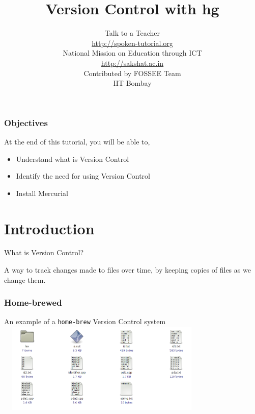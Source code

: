 \documentclass[17pt,compress]{beamer}
\author[FOSSEE]{}
\institute[IIT Bombay]{}
\date[]{}
\newcommand{\typ}[1]{\lstinline{#1}}
\begin{document}
\sffamily \bfseries
\title
[Version Control with hg]
{Version Control with hg}
\author
[FOSSEE]
{\small Talk to a Teacher\\{\color{blue}\url{http://spoken-tutorial.org}}\\\vspace{0.25cm}National Mission on Education
 through ICT\\{\color{blue}\url{ http://sakshat.ac.in}} \\ [1.65cm]
   Contributed by FOSSEE Team \\IIT Bombay  \\[0.3cm]
}

\begin{frame}
   \titlepage
\end{frame}

\begin{frame}
\frametitle{Objectives}
\label{sec-2}

At the end of this tutorial, you will be able to,
\begin{itemize}
  \item Understand what is Version Control
  \item Identify the need for using Version Control
  \item Install Mercurial
\end{itemize}
\end{frame}

\section{Introduction}

\begin{frame}[fragile]
  \begin{block}{What is Version Control?}
    
    A way to track changes made to files over time, by keeping copies
    of files as we change them.
    
  \end{block}
\end{frame}

\begin{frame}[fragile]
  \frametitle{Home-brewed}
  \begin{center}
    An example of a \typ{home-brew} Version Control system
    \includegraphics[height=1.7in,width=4in]{folder.png}
  \end{center}
\end{frame}
\end{document}
